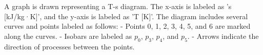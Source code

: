 A graph is drawn representing a T-s diagram. The x-axis is labeled as 's [kJ/kg·K]', and the y-axis is labeled as 'T [K]'. The diagram includes several curves and points labeled as follows:  
- Points 0, 1, 2, 3, 4, 5, and 6 are marked along the curves.  
- Isobars are labeled as \( p_0 \), \( p_3 \), \( p_4 \), and \( p_5 \).  
- Arrows indicate the direction of processes between the points.